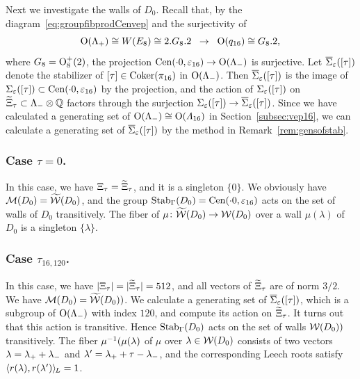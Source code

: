 \documentclass{amsart} %
\begin{document}
Next we investigate the walls of $D_0$.
Recall that, 
by 
the diagram~\eqref{eq:groupfibprodCenvep} and the surjectivity of 
\[
\mathord{\mathrm{O}}(\Lambda_{+})\cong W(E_8)\cong 2.G_8 . 2\;\;\to\;\; \mathord{\mathrm{O}}(q_{16})\cong G_8. 2,
\]
where $G_8=\mathord{\mathrm{O}}^+_{8} (2)$,
the projection
$\mathrm{Cen}(\cdot 0, \varepsilon_{16})\to \mathord{\mathrm{O}}(\Lambda_{-})$ is surjective.
Let $\overline{\Sigma}_{\varepsilon} ([\tau])$ denote the stabilizer of $[\tau]\in \operatorname{Coker}(\pi_{16})$ in $ \mathord{\mathrm{O}}(\Lambda_{-})$.
Then $\overline{\Sigma}_{\varepsilon} ([\tau])$ is the image of $\Sigma_{\varepsilon} ([\tau])\subset \mathrm{Cen}(\cdot 0, \varepsilon_{16})$
by the projection, and 
the action of $\Sigma_{\varepsilon} ([\tau])$
on $\widetilde{\Xi}_{\tau}\subset \Lambda_{-}\otimes \mathord{\mathbb{Q}}$ 
factors through the surjection $\Sigma_{\varepsilon} ([\tau])\to\overline{\Sigma}_{\varepsilon} ([\tau])$.
Since we have calculated a generating set of $ \mathord{\mathrm{O}}(\Lambda_{-})\cong \mathord{\mathrm{O}}(\varLambda_{16})$
 in Section~\ref{subsec:vep16},
we can calculate a generating set of $\overline{\Sigma}_{\varepsilon} ([\tau])$
by the method in Remark~\ref{rem:gensofstab}.
%
\subsubsection{Case $\tau=0$.}
%
In this case,
we have $\Xi_{\tau}=\widetilde{\Xi}_{\tau}$,
and it is a singleton $\{0\}$.
We obviously have $\mathord{\mathcal{M}}(D_0)=\widetilde{\mathord{\mathcal{W}}}(D_0)$,
and the group $\operatorname{Stab}_{\Gamma}(D_0)=\mathrm{Cen}(\cdot 0, \varepsilon_{16})$ acts 
on the set of walls of $D_0$ transitively.
The fiber of $\mu\colon \widetilde{\mathord{\mathcal{W}}}(D_0)\to\mathord{\mathcal{W}}(D_0)$ 
over a wall $\mu(\lambda)$ of $D_0$ is a singleton $\{\lambda\}$.
%
%
\subsubsection{Case $\tau_{16, 120}$.}
%
In this case,
we have $|\Xi_{\tau}|=|\widetilde{\Xi}_{\tau}|=512$,
and all vectors of $\widetilde{\Xi}_{\tau}$ are of norm $3/2$.
We have $\mathord{\mathcal{M}}(D_0)=\widetilde{\mathord{\mathcal{W}}}(D_0))$.
We calculate a generating set of $\overline{\Sigma}_{\varepsilon} ([\tau])$,
which is a subgroup of $ \mathord{\mathrm{O}}(\Lambda_{-})$ with index $120$,
and compute its action on $\widetilde{\Xi}_{\tau}$.
It turns out that this action is transitive.
Hence $\operatorname{Stab}_{\Gamma}(D_0)$ acts on the set of walls $\mathord{\mathcal{W}}(D_0))$ transitively.
The fiber 
 $\mu^{-1}(\mu(\lambda)$ of $\mu$ over $\lambda\in \mathord{\mathcal{W}}(D_0)$ consists 
of two vectors
$\lambda={\lambda}_{+}+{\lambda}_{-}$ and $\lambda^{\prime}={\lambda}_{+}+\tau-{\lambda}_{-}$, and 
the corresponding Leech roots 
 satisfy
$\langle r(\lambda), r(\lambda^{\prime}) \rangle_{\hskip -1pt L}=1$.
%
\end{document}
